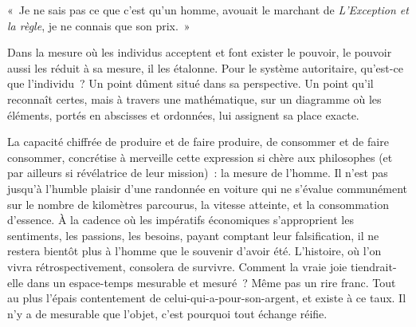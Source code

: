 \documentclass[french,twoside]{book} %
\newcommand{\astermono}{\medskip\centerline{\color{rubric}\large\selectfont{\syms ✻}}\medskip\par}%
\newenvironment{quoteblock}%
  {\begin{quoting}}
  {\end{quoting}}
\newenvironment{quotebar}{%
    \def\FrameCommand{{\color{rubric!10!}\vrule width 0.5em} \hspace{0.9em}}%
    \def\OuterFrameSep{\itemsep} %
    \MakeFramed {\advance\hsize-\width \FrameRestore}
  }%
  {%
    \endMakeFramed
  }
\renewenvironment{quoteblock}%
  {%
    \savenotes
    \setstretch{0.9}
    \normalfont
    \begin{quotebar}
  }
  {%
    \end{quotebar}
    \spewnotes
  }
\begin{document}
\begin{quoteblock}
\noindent « Je ne sais pas ce que c’est qu’un homme, avouait le marchant de \emph{L’Exception et la règle}, je ne connais que son prix. »\end{quoteblock}

\noindent Dans la mesure où les individus acceptent et font exister le pouvoir, le pouvoir aussi les réduit à sa mesure, il les étalonne. Pour le système autoritaire, qu’est-ce que l’individu ? Un point dûment situé dans sa perspective. Un point qu’il reconnaît certes, mais à travers une mathématique, sur un diagramme où les éléments, portés en abscisses et ordonnées, lui assignent sa place exacte.\par
La capacité chiffrée de produire et de faire produire, de consommer et de faire consommer, concrétise à merveille cette expression si chère aux philosophes (et par ailleurs si révélatrice de leur mission) : la mesure de l’homme. Il n’est pas jusqu’à l’humble plaisir d’une randonnée en voiture qui ne s’évalue communément sur le nombre de kilomètres parcourus, la vitesse atteinte, et la consommation d’essence. À la cadence où les impératifs économiques s’approprient les sentiments, les passions, les besoins, payant comptant leur falsification, il ne restera bientôt plus à l’homme que le souvenir d’avoir été. L’histoire, où l’on vivra rétrospectivement, consolera de survivre. Comment la vraie joie tiendrait-elle dans un espace-temps mesurable et mesuré ? Même pas un rire franc. Tout au plus l’épais contentement de celui-qui-a-pour-son-argent, et existe à ce taux. Il n’y a de mesurable que l’objet, c’est pourquoi tout échange réifie.\par

\astermono
\end{document}
